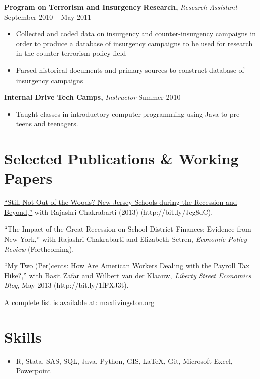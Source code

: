 \documentclass{res}
\begin{document}
\begin{resume}
  {\bf Program on Terrorism and Insurgency Research,} {\it Research Assistant}  \hfill  September 2010 -- May 2011
  \begin{itemize} \itemsep -2pt %
  \item Collected and coded data on insurgency and counter-insurgency campaigns in order to produce a database of insurgency campaigns to be used for research in the counter-terrorism policy field
  \item Parsed historical documents and primary sources to construct database of insurgency campaigns
  \end{itemize}

  {\bf Internal Drive Tech Camps,} {\it Instructor} \hfill Summer 2010
  \begin{itemize} \itemsep -2pt  %
  \item Taught classes in introductory computer programming using Java to pre-teens and teenagers.
  \end{itemize}
  
  \section{Selected Publications \& Working Papers} 
  \href{http://bit.ly/Jcg8dC}{``Still Not Out of the Woods? New Jersey Schools during the Recession and Beyond,''} with Rajashri Chakrabarti (2013) (http://bit.ly/Jcg8dC). 

  ``The Impact of the Great Recession on School District Finances: Evidence from New York,'' with Rajashri Chakrabarti and Elizabeth Setren, {\it Economic Policy Review} (Forthcoming).

  \href{http://bit.ly/1fFXJ3t}{``My Two (Per)cents: How Are American Workers Dealing with the Payroll Tax Hike?,''} with Basit Zafar and Wilbert van der Klaauw, {\it Liberty Street Economics Blog}, May 2013 (http://bit.ly/1fFXJ3t).

  A complete list is available at: \href{http://maxlivingston.org}{maxlivingston.org}
  \section{Skills}
  \begin{itemize} \itemsep -2pt
  \item R, Stata, SAS, SQL, Java, Python, GIS, \LaTeX, Git, Microsoft Excel, Powerpoint
  \end{itemize}

\end{resume} 
\end{document}
